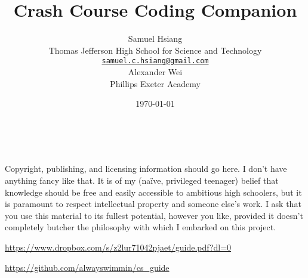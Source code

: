 \title{Crash Course Coding Companion}
\author{
Samuel Hsiang \\ 
Thomas Jefferson High School for Science and Technology \\ 
\href{mailto:samuel.c.hsiang@gmail.com}{\texttt{\textup{samuel.c.hsiang@gmail.com}}} \\
\vspace{.7em}
Alexander Wei \\
Phillips Exeter Academy
}
\date{\today}

\maketitle

\newpage
~\vfill
\thispagestyle{empty}


\noindent Copyright, publishing, and licensing information should go here. I don't have anything fancy like that. It is of my (na\"{i}ve, privileged teenager) belief that knowledge should be free and easily accessible to ambitious high schoolers, but it is paramount to respect intellectual property and someone else's work. I ask that you use this material to its fullest potential, however you like, provided it doesn't completely butcher the philosophy with which I embarked on this project.



\noindent \url{https://www.dropbox.com/s/z2lur71042pjaet/guide.pdf?dl=0}

\noindent \url{https://github.com/alwayswimmin/cs_guide}



\newpage
\thispagestyle{empty}
\par\vspace*{.35\textheight}{\centering For Rachel \par}

